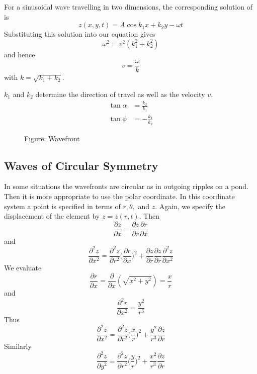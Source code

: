 \documentclass[../../../main.tex]{subfiles}
\begin{document}
For a sinusoidal wave travelling in two dimensions, the corresponding solution of is
\begin{equation*}
    z(x,y,t)=A\cos k_1x+k_2y-\omega t
\end{equation*}
Substituting this solution into our equation gives
\begin{equation*}
    \omega^2=v^2(k_1^2+k_2^2)
\end{equation*}
and hence
\begin{equation*}
    v=\frac{\omega}{k}
\end{equation*}
with $k=\sqrt{k_1+k_2}$.

$k_1$ and $k_2$ determine the direction of travel as well as the velocity $v$.
\begin{align*}
    \tan \alpha&=\frac{k_2}{k_1}\\
    \tan\phi&=-\frac{k_1}{k_2}
\end{align*}

\begin{figure*}
    \centering
    \caption*{Figure: Wavefront}
\end{figure*}

\subsection*{Waves of Circular Symmetry}
In some situations the wavefronts are circular as in outgoing ripples on a pond. Then it is more appropriate to use the polar coordinate. In this coordinate system a point is speciﬁed in terms of $r, \theta,$ and $z$. Again, we specify the displacement of the element by $z=z(r,t)$. Then
\begin{equation*}
    \frac{\partial z}{\partial x}=\frac{\partial z}{\partial r}\frac{\partial r}{\partial x}
\end{equation*}
and
\begin{equation*}
    \frac{\partial^2 z}{\partial x^2}=\frac{\partial^2 z}{\partial r^2}\biggl(\frac{\partial r}{\partial x}\biggr)^2+ \frac{\partial z}{\partial r}\frac{\partial z}{\partial r}\frac{\partial^2 z}{\partial x^2}
\end{equation*}
We evaluate
\begin{equation*}
    \frac{\partial r}{\partial x}=\frac{\partial }{\partial x}(\sqrt{x^2+y^2}) = \frac{x}{r}
\end{equation*}
and
\begin{equation*}
    \frac{\partial^2 r}{\partial x^2}= \frac{y^2}{r^3}
\end{equation*}
Thus
\begin{equation*}
    \frac{\partial^2 z}{\partial x^2}= \frac{\partial^2 z}{\partial r^2}\biggl(\frac{x}{r}\biggr)^2 + \frac{y^2}{r^3}\frac{\partial z}{\partial r}
\end{equation*}
Similarly
\begin{equation*}
    \frac{\partial^2 z}{\partial y^2}= \frac{\partial^2 z}{\partial r^2}\biggl(\frac{y}{r}\biggr)^2 + \frac{x^2}{r^3}\frac{\partial z}{\partial r}
\end{equation*}
\end{document}

